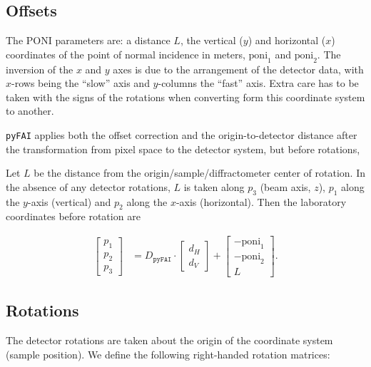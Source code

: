 \documentclass[12pt]{article}
\begin{document}
\subsection{Offsets}

The PONI parameters are: a distance $L$, the vertical ($y$) and
horizontal ($x$) coordinates of the point of normal incidence in
meters, $\mathrm{poni}_1$ and $\mathrm{poni}_2$. The inversion of the
$x$ and $y$ axes is due to the arrangement of the detector data, with
$x$-rows being the ``slow'' axis and $y$-columns the ``fast''
axis. Extra care has to be taken with the signs of the rotations when
converting form this coordinate system to another.

\texttt{pyFAI} applies both the offset correction and the
origin-to-detector distance after the transformation from pixel space
to the detector system, but before rotations,

Let $L$ be the distance from the origin/sample/diffractometer center
of rotation. In the absence of any detector rotations, $L$ is taken
along $p_3$ (beam axis, $z$), $p_1$ along the $y$-axis (vertical)
and $p_2$ along the $x$-axis (horizontal). Then the laboratory
coordinates before rotation are

\begin{align}
  \begin{bmatrix}
    p_1 \\ p_2 \\ p_3
  \end{bmatrix}
  & =
  D_{\mathtt{pyFAI}} \cdot \begin{bmatrix} d_H \\ d_V \end{bmatrix}
  +
  \begin{bmatrix} -\mathrm{poni}_1 \\ -\mathrm{poni}_2 \\ L \end{bmatrix}.
\end{align}

\subsection{Rotations}

The detector rotations are taken about the origin of the coordinate
system (sample position). We define the following right-handed
rotation matrices:
\end{document}

